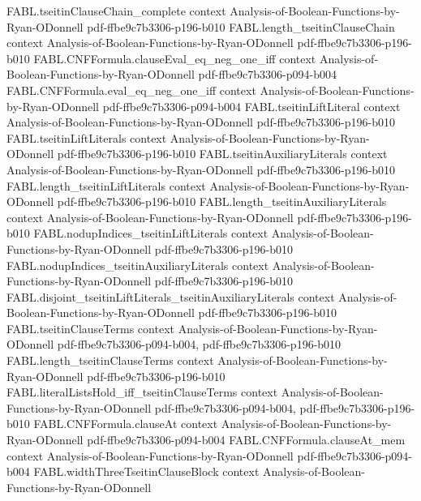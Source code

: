 \begin{theorem}
  {FABL.tseitinClauseChain_complete}
  {context}
  {Analysis-of-Boolean-Functions-by-Ryan-ODonnell}
  {pdf-ffbe9c7b3306-p196-b010}
\proofstep
  {FABL.length_tseitinClauseChain}
  {context}
  {Analysis-of-Boolean-Functions-by-Ryan-ODonnell}
  {pdf-ffbe9c7b3306-p196-b010}
\proofstep
  {FABL.CNFFormula.clauseEval_eq_neg_one_iff}
  {context}
  {Analysis-of-Boolean-Functions-by-Ryan-ODonnell}
  {pdf-ffbe9c7b3306-p094-b004}
\proofstep
  {FABL.CNFFormula.eval_eq_neg_one_iff}
  {context}
  {Analysis-of-Boolean-Functions-by-Ryan-ODonnell}
  {pdf-ffbe9c7b3306-p094-b004}
\proofstep
  {FABL.tseitinLiftLiteral}
  {context}
  {Analysis-of-Boolean-Functions-by-Ryan-ODonnell}
  {pdf-ffbe9c7b3306-p196-b010}
\proofstep
  {FABL.tseitinLiftLiterals}
  {context}
  {Analysis-of-Boolean-Functions-by-Ryan-ODonnell}
  {pdf-ffbe9c7b3306-p196-b010}
\proofstep
  {FABL.tseitinAuxiliaryLiterals}
  {context}
  {Analysis-of-Boolean-Functions-by-Ryan-ODonnell}
  {pdf-ffbe9c7b3306-p196-b010}
\proofstep
  {FABL.length_tseitinLiftLiterals}
  {context}
  {Analysis-of-Boolean-Functions-by-Ryan-ODonnell}
  {pdf-ffbe9c7b3306-p196-b010}
\proofstep
  {FABL.length_tseitinAuxiliaryLiterals}
  {context}
  {Analysis-of-Boolean-Functions-by-Ryan-ODonnell}
  {pdf-ffbe9c7b3306-p196-b010}
\proofstep
  {FABL.nodupIndices_tseitinLiftLiterals}
  {context}
  {Analysis-of-Boolean-Functions-by-Ryan-ODonnell}
  {pdf-ffbe9c7b3306-p196-b010}
\proofstep
  {FABL.nodupIndices_tseitinAuxiliaryLiterals}
  {context}
  {Analysis-of-Boolean-Functions-by-Ryan-ODonnell}
  {pdf-ffbe9c7b3306-p196-b010}
\proofstep
  {FABL.disjoint_tseitinLiftLiterals_tseitinAuxiliaryLiterals}
  {context}
  {Analysis-of-Boolean-Functions-by-Ryan-ODonnell}
  {pdf-ffbe9c7b3306-p196-b010}
\proofstep
  {FABL.tseitinClauseTerms}
  {context}
  {Analysis-of-Boolean-Functions-by-Ryan-ODonnell}
  {pdf-ffbe9c7b3306-p094-b004,
    pdf-ffbe9c7b3306-p196-b010}
\proofstep
  {FABL.length_tseitinClauseTerms}
  {context}
  {Analysis-of-Boolean-Functions-by-Ryan-ODonnell}
  {pdf-ffbe9c7b3306-p196-b010}
\proofstep
  {FABL.literalListsHold_iff_tseitinClauseTerms}
  {context}
  {Analysis-of-Boolean-Functions-by-Ryan-ODonnell}
  {pdf-ffbe9c7b3306-p094-b004,
    pdf-ffbe9c7b3306-p196-b010}
\proofstep
  {FABL.CNFFormula.clauseAt}
  {context}
  {Analysis-of-Boolean-Functions-by-Ryan-ODonnell}
  {pdf-ffbe9c7b3306-p094-b004}
\proofstep
  {FABL.CNFFormula.clauseAt_mem}
  {context}
  {Analysis-of-Boolean-Functions-by-Ryan-ODonnell}
  {pdf-ffbe9c7b3306-p094-b004}
\proofstep
  {FABL.widthThreeTseitinClauseBlock}
  {context}
  {Analysis-of-Boolean-Functions-by-Ryan-ODonnell}

\end{theorem}
